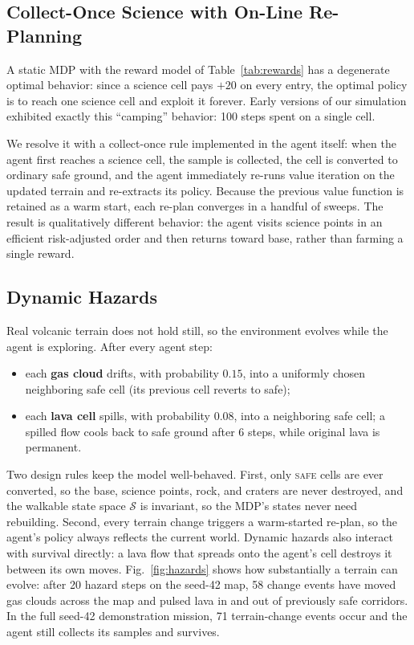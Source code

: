 \documentclass[conference]{IEEEtran}
\begin{document}
\subsection{Collect-Once Science with On-Line Re-Planning}

A static MDP with the reward model of Table~\ref{tab:rewards} has a degenerate optimal behavior: since a science cell pays $+20$ on every entry, the optimal policy is to reach one science cell and exploit it forever. Early versions of our simulation exhibited exactly this ``camping'' behavior: 100 steps spent on a single cell.

We resolve it with a collect-once rule implemented in the agent itself: when the agent first reaches a science cell, the sample is collected, the cell is converted to ordinary safe ground, and the agent immediately re-runs value iteration on the updated terrain and re-extracts its policy. Because the previous value function is retained as a warm start, each re-plan converges in a handful of sweeps. The result is qualitatively different behavior: the agent visits science points in an efficient risk-adjusted order and then returns toward base, rather than farming a single reward.

\subsection{Dynamic Hazards}

Real volcanic terrain does not hold still, so the environment evolves while the agent is exploring. After every agent step:

\begin{itemize}
  \item each \textbf{gas cloud} drifts, with probability $0.15$, into a uniformly chosen neighboring safe cell (its previous cell reverts to safe);
  \item each \textbf{lava cell} spills, with probability $0.08$, into a neighboring safe cell; a spilled flow cools back to safe ground after 6 steps, while original lava is permanent.
\end{itemize}

Two design rules keep the model well-behaved. First, only \textsc{safe} cells are ever converted, so the base, science points, rock, and craters are never destroyed, and the walkable state space $\mathcal{S}$ is invariant, so the MDP's states never need rebuilding. Second, every terrain change triggers a warm-started re-plan, so the agent's policy always reflects the current world. Dynamic hazards also interact with survival directly: a lava flow that spreads onto the agent's cell destroys it between its own moves. Fig.~\ref{fig:hazards} shows how substantially a terrain can evolve: after 20 hazard steps on the seed-42 map, 58 change events have moved gas clouds across the map and pulsed lava in and out of previously safe corridors. In the full seed-42 demonstration mission, 71 terrain-change events occur and the agent still collects its samples and survives.
\end{document}
